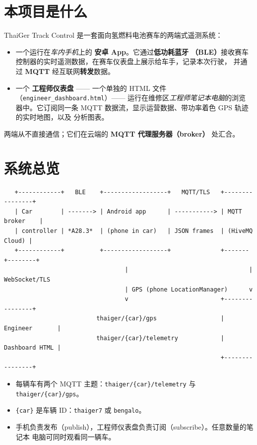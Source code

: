 \documentclass[11pt,a4paper,oneside]{report}
\newcommand{\code}[1]{\texttt{#1}}
\begin{document}
\section{本项目是什么}
ThaiGer Track Control 是一套面向氢燃料电池赛车的两端式遥测系统：
\begin{itemize}
  \item 一个运行在\emph{车内手机}上的 \textbf{安卓 App}。它通过\textbf{低功耗蓝牙
    （BLE）}接收赛车控制器的实时遥测数据，在赛车仪表盘上展示给车手，记录本次行驶，
    并通过 \textbf{MQTT} 经互联网\textbf{转发}数据。
  \item 一个 \textbf{工程师仪表盘} —— 一个单独的 HTML 文件
    （\code{engineer\_dashboard.html}）—— 运行在维修区\emph{工程师笔记本电脑}的浏览
    器中。它订阅同一条 MQTT 数据流，显示运营数据、带功率着色 GPS 轨迹的实时地图，以及
    分析图表。
\end{itemize}
两端从不直接通信；它们在云端的 \textbf{MQTT 代理服务器（broker）} 处汇合。

\section{系统总览}

\begin{lstlisting}
   +------------+   BLE    +------------------+   MQTT/TLS   +----------------+
   | Car        | -------> | Android app      | -----------> | MQTT broker    |
   | controller | *A28.3*  | (phone in car)   | JSON frames  | (HiveMQ Cloud) |
   +------------+          +------------------+              +-------+--------+
                                  |                                  | WebSocket/TLS
                                  | GPS (phone LocationManager)      v
                                  v                          +----------------+
                          thaiger/{car}/gps                  | Engineer       |
                          thaiger/{car}/telemetry            | Dashboard HTML |
                                                             +----------------+
\end{lstlisting}
\begin{itemize}
  \item 每辆车有两个 MQTT 主题：\code{thaiger/\{car\}/telemetry} 与
    \code{thaiger/\{car\}/gps}。
  \item \code{\{car\}} 是车辆 ID：\code{thaiger7} 或 \code{bengalo}。
  \item 手机负责发布（publish），工程师仪表盘负责订阅（subscribe）。任意数量的笔记本
    电脑可同时观看同一辆车。
\end{itemize}
\end{document}
